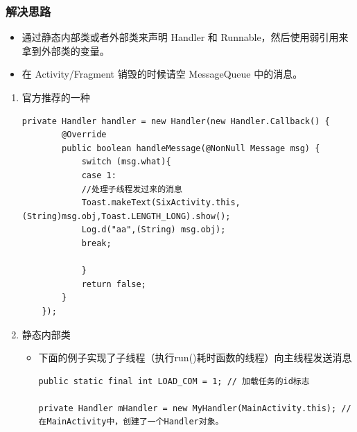 \documentclass[9pt, b5paper]{article}
\begin{document}
\subsubsection{解决思路}
\label{sec-2-1-1}
\begin{itemize}
\item 通过静态内部类或者外部类来声明 Handler 和 Runnable，然后使用弱引用来拿到外部类的变量。
\item 在 Activity/Fragment 销毁的时候请空 MessageQueue 中的消息。
\end{itemize}
\begin{enumerate}
\item 官方推荐的一种
\label{sec-2-1-1-1}
\begin{verbatim}
private Handler handler = new Handler(new Handler.Callback() {
        @Override
        public boolean handleMessage(@NonNull Message msg) {
            switch (msg.what){
            case 1:
            //处理子线程发过来的消息
            Toast.makeText(SixActivity.this,(String)msg.obj,Toast.LENGTH_LONG).show();
            Log.d("aa",(String) msg.obj);
            break;

            }
            return false;
        }
    });
\end{verbatim}
\item 静态内部类
\label{sec-2-1-1-2}
\begin{itemize}
\item 下面的例子实现了子线程（执行run()耗时函数的线程）向主线程发送消息
\begin{verbatim}
public static final int LOAD_COM = 1; // 加载任务的id标志

private Handler mHandler = new MyHandler(MainActivity.this); // 在MainActivity中，创建了一个Handler对象。


\end{verbatim}
\end{itemize}
\end{enumerate}
\end{document}
